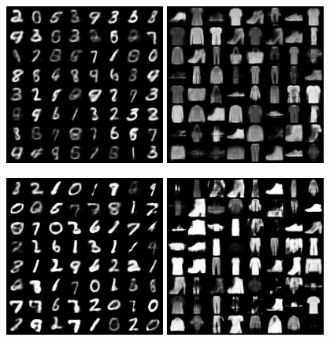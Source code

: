 \documentclass{article}
\begin{document}
 \begin{figure}  [!h]
   \begin{center} 
 {\includegraphics[width=0.47\textwidth]{figs/pics/VanillaVAE_mnist.png}} 
 {\includegraphics[width=0.47\textwidth]{figs/pics/VanillaVAE_fashion.png}} 

 {\includegraphics[width=0.47\textwidth]{figs/pics/RHO_VanillaVAE_mnist.png}} 
 {\includegraphics[width=0.47\textwidth]{figs/pics/RHO_VanillaVAE_fashion.png}} 


\end{center}
\end{figure}
\end{document}
